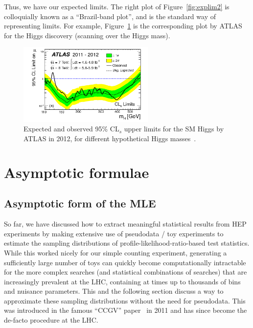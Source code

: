 Thus, we have our expected limits.
The right plot of Figure~\ref{fig:explim2} is colloquially known as a ``Brazil-band plot'', and is the standard way of representing limits.
For example, Figure~\ref{fig:atlas_higgs} is the corresponding plot by ATLAS for the Higgs discovery (scanning over the Higgs mass).

\begin{figure}[htb]
\centering
\includegraphics[width=0.6\textwidth]{figures/04-expected/atlas_limits.png}
\caption{Expected and observed 95\% CL$_s$ upper limits for the SM Higgs by ATLAS in 2012, for different hypothetical Higgs masses~\cite{ATLAS:2012yve}.}
\label{fig:atlas_higgs}
\end{figure}


\part{Asymptotic formulae}
\label{sec:asymptotic}

\chapter{Asymptotic form of the MLE}
\label{sec:asymptotic_mle}

So far, we have discussed how to extract meaningful statistical results from HEP experiments by making extensive use of pseudodata / toy experiments to estimate the sampling distributions of profile-likelihood-ratio-based test statistics.
While this worked nicely for our simple counting experiment, generating a sufficiently large number of toys can quickly become computationally intractable for the more complex searches (and statistical combinations of searches) that are increasingly prevalent at the LHC, containing at times up to thousands of bins and nuisance parameters.
This and the following section discuss a way to approximate these sampling distributions without the need for pseudodata.
This was introduced in the famous ``CCGV'' paper~\cite{Cowan:2010js} in 2011 and has since become the de-facto procedure at the LHC.


